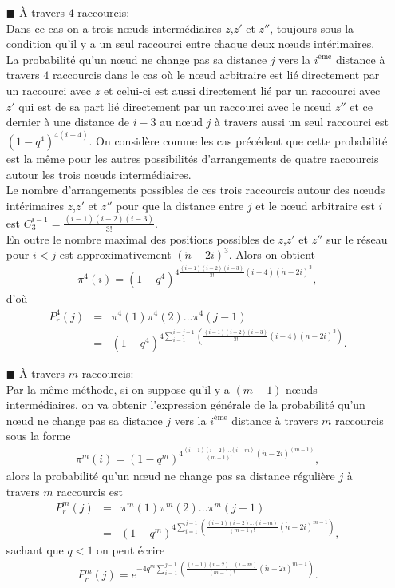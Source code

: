 \begin{itemize}
\item[$\blacksquare$] \`{A} travers $4$ raccourcis:\\
Dans ce cas on a trois nœuds intermédiaires $z$,$z'$ et $z''$, toujours sous la condition  qu'il y a un seul raccourci entre chaque deux nœuds
intérimaires. La probabilité qu'un nœud ne change pas sa distance $j$ vers la $i^{\text{ème}}$ distance à travers $4$ raccourcis dans 
le cas où le nœud arbitraire est lié directement par un raccourci avec $z$ et celui-ci est aussi directement lié par un raccourci 
avec $z'$ qui est de sa part lié directement par un raccourci avec le nœud $z''$  et ce dernier à une distance de $i-3$ au
nœud $j$ à travers aussi un seul raccourci est $(1-q^4)^{4(i-4)}$.
On considère comme les cas précédent que cette probabilité est la m\^{e}me
pour les autres possibilités d'arrangements de quatre raccourcis autour les trois nœuds intermédiaires.\\ Le nombre d'arrangements possibles de ces trois raccourcis
autour des nœuds intérimaires $z$,$z'$ et $z''$ pour que la distance entre $j$ et le nœud  arbitraire est $i$ est
$C_3^{i-1}=\frac{(i-1)(i-2)(i-3)}{3!}$.\\ En outre le nombre maximal  des positions possibles de $z$,$z'$ et $z''$ sur le réseau pour $i<j$ est  approximativement
$(\acute{n}-2i)^3$.
Alors on obtient
\begin{eqnarray}
	\pi^4(i)=(1-q^4)^{4\frac{(i-1)(i-2)(i-3)}{3!}(i-4)(\acute{n}-2i)^3},\nonumber
	\end{eqnarray}
	d'où
	\begin{eqnarray}
	P_r^4(j)&=&\pi^4(1)\pi^4(2)...\pi^4(j-1)\\\nonumber
	&=& (1-q^4)^{4\sum_{i=1}^{i=j-1}(\frac{(i-1)(i-2)(i-3)}{3!}(i-4)(\acute{n}-2i)^3)}.
	\end{eqnarray}
	
\item[$\blacksquare$] \`{A} travers $m$ raccourcis:\\
Par la m\^{e}me méthode, si on suppose qu'il  y a $(m-1)$ nœuds intermédiaires, on va obtenir l'expression générale de la probabilité qu'un nœud ne change pas sa distance $j$ vers la $i^{\text{ème}}$ distance à travers $m$ raccourcis sous la forme 
\begin{eqnarray}
	\pi^m(i)=(1-q^m)^{4\frac{(i-1)(i-2)\ldots(i-m)}{(m-1)!}(\acute{n}-2i)^{(m-1)}},\nonumber
\end{eqnarray}
alors la probabilité qu'un nœud ne change pas sa distance régulière $j$ à travers $m$ raccourcis est
\begin{eqnarray}
	P_r^m(j)&=&\pi^m(1)\pi^m(2)...\pi^m(j-1)\\\nonumber
	&=& (1-q^m)^{4\sum_{i=1}^{j-1}(\frac{(i-1)(i-2)\ldots(i-m)}{(m-1)!}(\acute{n}-2i)^{m-1})},
	\end{eqnarray}
sachant que $q<1$ on peut écrire 
\begin{eqnarray}
P_r^m(j)=e^{-4q^m\sum_{i=1}^{j-1}(\frac{(i-1)(i-2)\ldots(i-m)}{(m-1)!}(\acute{n}-2i)^{m-1})}.
\end{eqnarray}
\end{itemize}

